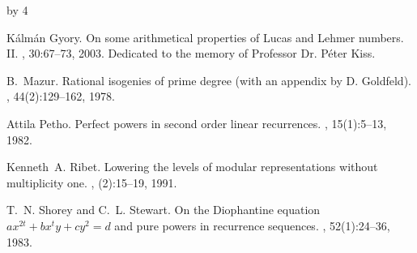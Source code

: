 \documentclass[12pt]{scrartcl}
\def\anzspalten{4}
\newlength{\kastenwidth}
\newenvironment{kasten}{%
  \begin{lrbox}{\dummybox}%
    \begin{minipage}{0.96\linewidth}}%
    {\end{minipage}%
  \end{lrbox}%
  \raisebox{-\depth}{\psshadowbox[framesep=1em]{\usebox{\dummybox}}}\\[0.5em]}
\newenvironment{spalte}{%
  \setlength\kastenwidth{1.2\textwidth}
  \divide\kastenwidth by \anzspalten
  \begin{minipage}[t]{\kastenwidth}}{\end{minipage}\hfill}
\begin{document}
\begin{lrbox}{\spalten}
{\begin{spalte}
\begin{kasten}
{\begin{thebibliography}{10}




K{\'a}lm{\'a}n Gyory.
\newblock On some arithmetical properties of {L}ucas and {L}ehmer numbers.
  {II}.
, 30:67--73,
  2003.
\newblock Dedicated to the memory of Professor Dr. P{\'e}ter Kiss.

B.~Mazur.
\newblock Rational isogenies of prime degree (with an appendix by {D}.
  {G}oldfeld).
, 44(2):129--162, 1978.



Attila Petho.
\newblock Perfect powers in second order linear recurrences.
, 15(1):5--13, 1982.

Kenneth~A. Ribet.
\newblock Lowering the levels of modular representations without multiplicity
  one.
, (2):15--19, 1991.


T.~N. Shorey and C.~L. Stewart.
\newblock On the {D}iophantine equation {$ax^{2t}+bx^{t}y+cy^{2}=d$} and pure
  powers in recurrence sequences.
, 52(1):24--36, 1983.


\end{thebibliography}}
\end{kasten}
\end{spalte}}
\end{lrbox}
\end{document}
